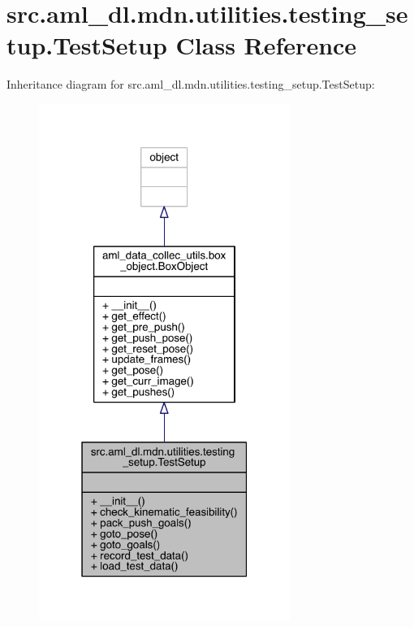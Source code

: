 \hypertarget{classsrc_1_1aml__dl_1_1mdn_1_1utilities_1_1testing__setup_1_1_test_setup}{}\section{src.\+aml\+\_\+dl.\+mdn.\+utilities.\+testing\+\_\+setup.\+Test\+Setup Class Reference}
\label{classsrc_1_1aml__dl_1_1mdn_1_1utilities_1_1testing__setup_1_1_test_setup}


Inheritance diagram for src.\+aml\+\_\+dl.\+mdn.\+utilities.\+testing\+\_\+setup.\+Test\+Setup\+:
\nopagebreak
\begin{figure}[H]
\begin{center}
\leavevmode
\includegraphics[width=232pt]{classsrc_1_1aml__dl_1_1mdn_1_1utilities_1_1testing__setup_1_1_test_setup__inherit__graph}
\end{center}
\end{figure}


